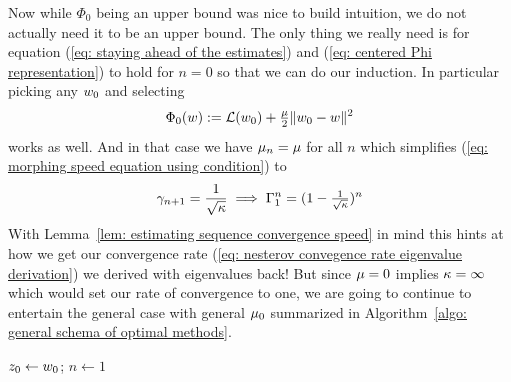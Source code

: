 Now while \(\Phi_0\) being an upper bound was nice to build intuition, we do
not actually need it to be an upper bound. The only thing we really need is
for equation (\ref{eq: staying ahead of the estimates}) and (\ref{eq: centered
Phi representation}) to hold for \(n=0\) so that we can do our induction. In
particular picking any \(w_0\) and selecting
\begin{align*}
	\Phi_0(w):= \mathcal{L}(w_0) + \tfrac{\mu}{2}\|w_0 - w\|^2
\end{align*}
works as well. And in that case we have \(\mu_n = \mu\) for all \(n\)
which simplifies (\ref{eq: morphing speed equation using condition}) to
\begin{align}\label{eq: convergence rate for lbound_0=lbound}
	\gamma_{n+1} = \frac1{\sqrt{\kappa}} \implies \Gamma_1^n = (1-\tfrac{1}{\sqrt{\kappa}})^n
\end{align}
With Lemma~\ref{lem: estimating sequence convergence speed} in mind this hints
at how we get our convergence rate (\ref{eq: nesterov convegence rate eigenvalue derivation})
we derived with eigenvalues back!
But since \(\mu=0\) implies \(\kappa=\infty\)
which would set our rate of convergence to one, we are going to continue
to entertain the general case with general \(\mu_0\) summarized in
Algorithm~\ref{algo: general schema of optimal methods}. 
%
\begin{algorithm}
	\(z_0\leftarrow w_0\);
	\(n\leftarrow 1\)\;
	\caption{
		General Schema of Optimal Methods (by \citeauthor{nesterovLecturesConvexOptimization2018})%
		\label{algo: general schema of optimal methods}
	}
\end{algorithm}
